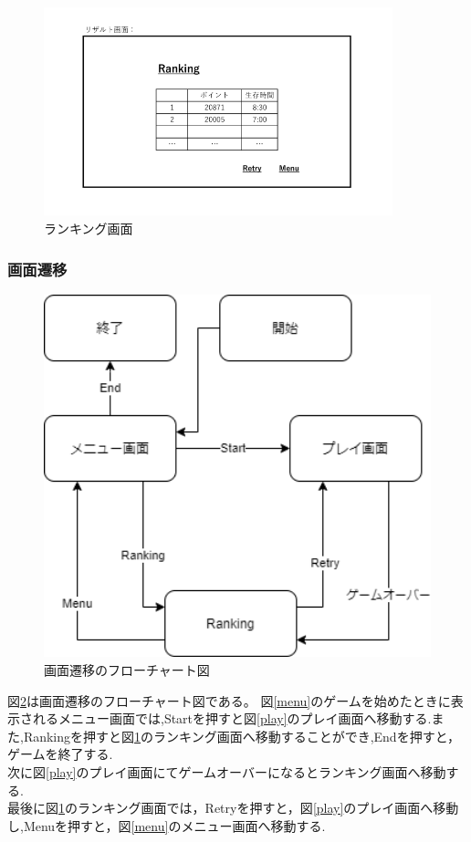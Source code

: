 \documentclass[a4paper,11pt]{jsarticle}
\begin{document}
\begin{figure}[H]
  \centering\includegraphics[clip,width=0.9\textwidth]{result.png}
  \caption{ランキング画面}
  \label{result}
\end{figure}

\subsubsection{画面遷移}
\begin{figure}[H]
  \centering\includegraphics[clip,scale=0.5,width=1.0\textwidth]{tetorismo.png}
  \caption{画面遷移のフローチャート図}
  \label{tetoris}
\end{figure}
図\ref{tetoris}は画面遷移のフローチャート図である。
図\ref{menu}のゲームを始めたときに表示されるメニュー画面では,Startを押すと図\ref{play}のプレイ画面へ移動する.また,Rankingを押すと図\ref{result}のランキング画面へ移動することができ,Endを押すと，ゲームを終了する.\\
次に図\ref{play}のプレイ画面にてゲームオーバーになるとランキング画面へ移動する.\\
最後に図\ref{result}のランキング画面では，Retryを押すと，図\ref{play}のプレイ画面へ移動し,Menuを押すと，図\ref{menu}のメニュー画面へ移動する.
\end{document}
